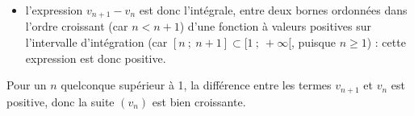 \begin{enumerate}
\begin{itemize}
		\item l'expression $v_{n+1} - v_n$ est donc l'intégrale, entre deux bornes ordonnées dans l'ordre croissant (car $n < n+1$) d'une fonction à valeurs positives sur l'intervalle d'intégration (car $[n ~;~ n+1] \subset [1 ~;~ +\infty[$, puisque $n\geqslant 1$) : cette expression est donc positive.

\end{itemize}
	Pour un $n$ quelconque supérieur à 1, la différence entre les termes $v_{n+1}$ et $v_n$ est positive, donc la suite $\left(v_n\right)$ est bien croissante.
\end{enumerate}
